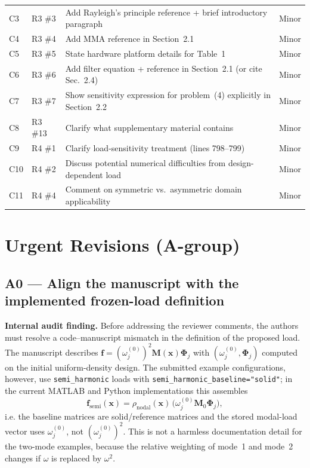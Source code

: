 \documentclass[12pt,a4paper]{article}
\newcommand{\minor}[1]{{\color{mminor}#1}}
\begin{document}
\begin{table}[htbp]
\begin{tabularx}{\textwidth}{@{}p{0.7cm}p{1.6cm}p{8.5cm}p{2.5cm}@{}}
C3 & R3 \#3  & Add Rayleigh's principle reference + brief introductory paragraph & \minor{Minor} \\
C4 & R3 \#4  & Add MMA reference in Section~2.1 & \minor{Minor} \\
C5 & R3 \#5  & State hardware platform details for Table~1 & \minor{Minor} \\
C6 & R3 \#6  & Add filter equation + reference in Section~2.1 (or cite Sec.~2.4) & \minor{Minor} \\
C7 & R3 \#7  & Show sensitivity expression for problem~(4) explicitly in Section~2.2 & \minor{Minor} \\
C8 & R3 \#13 & Clarify what supplementary material contains & \minor{Minor} \\
C9 & R4 \#1  & Clarify load-sensitivity treatment (lines 798--799) & \minor{Minor} \\
C10& R4 \#2  & Discuss potential numerical difficulties from design-dependent load & \minor{Minor} \\
C11& R4 \#4  & Comment on symmetric vs.\ asymmetric domain applicability & \minor{Minor} \\
\bottomrule
\end{tabularx}
\end{table}

\newpage
\section{Urgent Revisions (A-group)}

\subsection{A0 — Align the manuscript with the implemented frozen-load definition}

\textbf{Internal audit finding.}  Before addressing the reviewer comments,
the authors must resolve a code--manuscript mismatch in the definition of the
proposed load.  The manuscript describes
$\mathbf{f}=(\omega_j^{(0)})^2\mathbf{M}(\mathbf{x})\boldsymbol{\Phi}_j$
with $(\omega_j^{(0)},\boldsymbol{\Phi}_j)$ computed on the initial
uniform-density design.  The submitted example configurations, however, use
\texttt{semi\_harmonic} loads with
\texttt{semi\_harmonic\_baseline="solid"}; in the current MATLAB and Python
implementations this assembles
\[
  \mathbf{f}_{\mathrm{semi}}(\mathbf{x})
  = \rho_{\mathrm{nodal}}(\mathbf{x})\,
    \bigl(\omega_j^{(0)}\mathbf{M}_0\boldsymbol{\Phi}_j\bigr),
\]
i.e. the baseline matrices are solid/reference matrices and the stored
modal-load vector uses $\omega_j^{(0)}$, not $(\omega_j^{(0)})^2$.
This is not a harmless documentation detail for the two-mode examples,
because the relative weighting of mode~1 and mode~2 changes if $\omega$ is
replaced by $\omega^2$.
\end{document}
